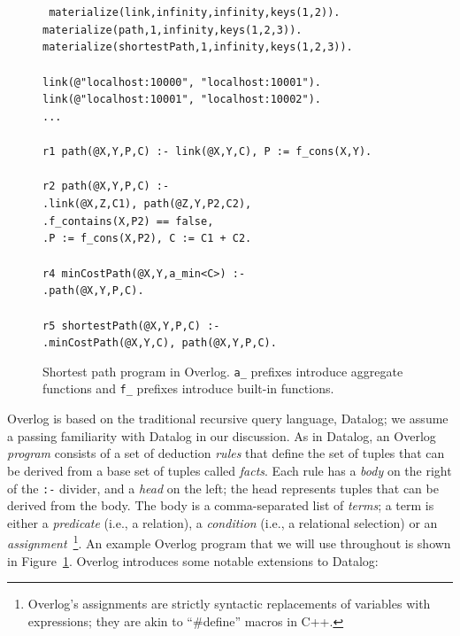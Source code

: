 \documentclass{sigmod08}
\newcommand{\datalogspace}{\textcolor[gray]{1}{.}\hspace{0.5in}}
\newcommand{\ol}[1]{\texttt{\small #1}\xspace}
\begin{document}
\begin{figure}
\centering
\begin{boxedminipage}{\linewidth}
\scriptsize{\tt
materialize(link,infinity,infinity,keys(1,2)). \\
materialize(path,1,infinity,keys(1,2,3)). \\
materialize(shortestPath,1,infinity,keys(1,2,3)).\\
\\
link(@"localhost:10000", "localhost:10001").\\
link(@"localhost:10001", "localhost:10002").\\
...\\
\\
r1 path(@X,Y,P,C) :- link(@X,Y,C), P := f\_cons(X,Y). \\
\\
r2 path(@X,Y,P,C) :- \\
\datalogspace link(@X,Z,C1), path(@Z,Y,P2,C2), \\
\datalogspace f\_contains(X,P2) == false, \\
\datalogspace P := f\_cons(X,P2), C := C1 + C2. \\
\\
r4 minCostPath(@X,Y,a\_min<C>) :- \\
\datalogspace path(@X,Y,P,C). \\
\\
r5 shortestPath(@X,Y,P,C) :- \\
\datalogspace minCostPath(@X,Y,C), path(@X,Y,P,C).
}
\caption{\label{fig:overlogSP}Shortest path program in Overlog. \ol{a\_}
prefixes introduce aggregate functions and \ol{f\_} prefixes introduce
built-in functions.}
\end{boxedminipage}
\end{figure}

Overlog is based on the traditional recursive query language, Datalog; we assume a passing familiarity with Datalog in our discussion.  As in Datalog, an Overlog {\em program} consists of a set of deduction {\em rules} that define the set of tuples that can be derived from a base set of tuples called {\em facts}. Each rule has a {\em body} on the right of the \texttt{:-} divider, and a {\em head} on the left; the head represents tuples that can be derived from the body.  The body is a comma-separated list of {\em terms}; a term is either a {\em predicate} (i.e., a relation), a {\em condition} (i.e., a relational selection) or an {\em assignment}~\footnote{Overlog's assignments 
are strictly syntactic replacements of variables with expressions; they
are akin to ``\#define'' macros in C++.}.  An example Overlog program that we will use throughout is shown in Figure~\ref{fig:overlogSP}.  Overlog introduces some notable extensions to Datalog:
\end{document}
